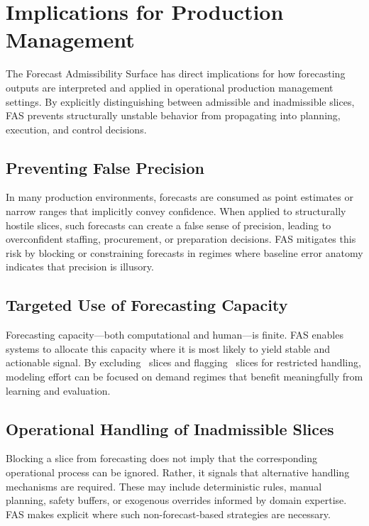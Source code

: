 
\section{Implications for Production Management}
\label{sec:fas_production_implications}

The Forecast Admissibility Surface has direct implications for how forecasting
outputs are interpreted and applied in operational production management
settings. By explicitly distinguishing between admissible and inadmissible
slices, FAS prevents structurally unstable behavior from propagating into
planning, execution, and control decisions.

\subsection{Preventing False Precision}

In many production environments, forecasts are consumed as point estimates or
narrow ranges that implicitly convey confidence. When applied to structurally
hostile slices, such forecasts can create a false sense of precision, leading to
overconfident staffing, procurement, or preparation decisions. FAS mitigates
this risk by blocking or constraining forecasts in regimes where baseline error
anatomy indicates that precision is illusory.

\subsection{Targeted Use of Forecasting Capacity}

Forecasting capacity—both computational and human—is finite. FAS enables systems
to allocate this capacity where it is most likely to yield stable and actionable
signal. By excluding \Blocked\ slices and flagging \Conditional\ slices for
restricted handling, modeling effort can be focused on demand regimes that
benefit meaningfully from learning and evaluation.

\subsection{Operational Handling of Inadmissible Slices}

Blocking a slice from forecasting does not imply that the corresponding
operational process can be ignored. Rather, it signals that alternative handling
mechanisms are required. These may include deterministic rules, manual planning,
safety buffers, or exogenous overrides informed by domain expertise. FAS makes
explicit where such non-forecast-based strategies are necessary.

